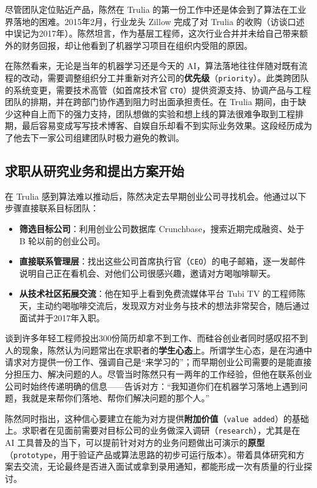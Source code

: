 \documentclass[UTF8,a4paper,11pt,fontset=fandol]{ctexart}
\begin{document}
尽管团队定位贴近产品，陈然在 Trulia 的第一份工作中还是体会到了算法在工业界落地的困难。2015年2月，行业龙头 Zillow 完成了对 Trulia 的收购（访谈口述中误记为2017年）。陈然坦言，作为基层工程师，这次行业合并并未给自己带来额外的财务回报，却让他看到了机器学习项目在组织内受阻的原因。

在陈然看来，无论是当年的机器学习还是今天的 AI，算法落地往往伴随对既有流程的改动，需要调整组织分工并重新对齐公司的\textbf{优先级}（\texttt{priority}）。此类跨团队的系统变更，需要技术高管（如首席技术官 \texttt{CTO}）提供资源支持、协调产品与工程团队的排期，并在跨部门协作遇到阻力时出面承担责任。在 Trulia 期间，由于缺少这种自上而下的强力支持，团队想做的实验和想上线的算法很难争取到工程排期，最后容易变成写写技术博客、自娱自乐却看不到实际业务效果。这段经历成为了他去下一家公司组建团队时极力避免的教训。

\subsection{求职从研究业务和提出方案开始}
在 Trulia 感到算法难以推动后，陈然决定去早期创业公司寻找机会。他通过以下步骤直接联系目标团队：
\begin{itemize}
\item \textbf{筛选目标公司}：利用创业公司数据库 Crunchbase，搜索近期完成融资、处于 B 轮以前的创业公司。
\item \textbf{直接联系管理层}：找出这些公司首席执行官（\texttt{CEO}）的电子邮箱，逐一发邮件说明自己正在看机会、对他们公司很感兴趣，邀请对方喝咖啡聊天。
\item \textbf{从技术社区拓展交流}：他在知乎上看到免费流媒体平台 Tubi TV 的工程师陈天，主动约喝咖啡交流后，发现双方对业务与技术的想法非常契合，随后通过面试并于2017年入职。
\end{itemize}

谈到许多年轻工程师投出300份简历却拿不到工作、而硅谷创业者同时感叹招不到人的现象，陈然认为问题常出在求职者的\textbf{学生心态}上。所谓学生心态，是在沟通中请求对方提供一份工作、强调自己是“来学习的”；而早期创业公司需要的是能直接分担压力、解决问题的人。尽管当时陈然只有一两年的工作经验，但他在联系创业公司时始终传递明确的信息——告诉对方：“我知道你们在机器学习落地上遇到问题，我就是来帮你们落地、帮你们解决问题的那个人。”

陈然同时指出，这种信心要建立在能为对方提供\textbf{附加价值}（\texttt{value added}）的基础上。求职者在见面前需要对目标公司的业务做深入调研（\texttt{research}），尤其是在 AI 工具普及的当下，可以提前针对对方的业务问题做出可演示的\textbf{原型}（\texttt{prototype}，用于验证产品或算法思路的初步可运行版本）。带着具体研究和方案去交流，无论最终是否进入面试或拿到录用通知，都能形成一次有质量的行业探讨。
\end{document}
